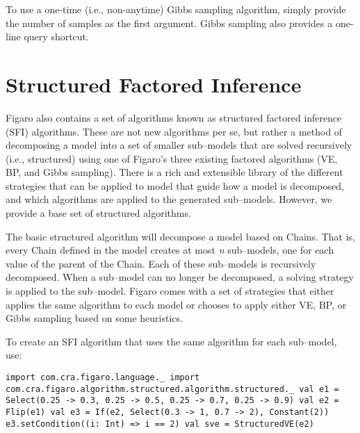To use a one-time (i.e., non-anytime) Gibbs sampling algorithm, simply provide the number of samples as the first argument. Gibbs sampling also provides a one-line query shortcut.

\section{Structured Factored Inference}

Figaro also contains a set of algorithms known as structured factored inference (SFI) algorithms. These are not new algorithms per se, but rather a method of decomposing a model into a set of smaller sub--models that are solved recursively (i.e., structured) using one of Figaro's three existing factored algorithms (VE, BP, and Gibbs sampling). There is a rich and extensible library of the different strategies that can be applied to model that guide how a model is decomposed, and which algorithms are applied to the generated sub--models. However, we provide a base set of structured algorithms.

The basic structured algorithm will decompose a model based on Chains. That is, every Chain defined in the model creates at most \textit{n} sub--models, one for each value of the parent of the Chain. Each of these sub--models is recursively decomposed. When a sub--model can no longer be decomposed, a solving strategy is applied to the sub--model. Figaro comes with a set of strategies that either applies the same algorithm to each model or chooses to apply either VE, BP, or Gibbs sampling based on some heuristics.

To create an SFI algorithm that uses the same algorithm for each sub--model, use:

\begin{flushleft}
\texttt{import com.cra.figaro.language.\_
\newline import com.cra.figaro.algorithm.structured.algorithm.structured.\_
\newline 
\newline val e1 = Select(0.25 -> 0.3, 0.25 -> 0.5, 0.25 -> 0.7, 0.25 -> 0.9)
\newline val e2 = Flip(e1)
\newline val e3 = If(e2, Select(0.3 -> 1, 0.7 -> 2), Constant(2))
\newline e3.setCondition((i: Int) => i == 2)
\newline 
\newline val sve = StructuredVE(e2)
}
\end{flushleft}

